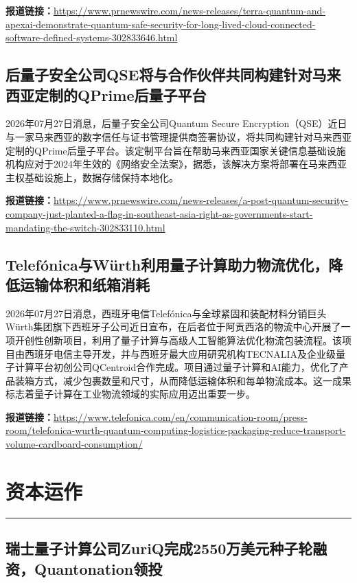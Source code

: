 \documentclass[12pt,a4paper]{ctexart}
\begin{document}
\noindent\textbf{报道链接：}\url{https://www.prnewswire.com/news-releases/terra-quantum-and-apexai-demonstrate-quantum-safe-security-for-long-lived-cloud-connected-software-defined-systems-302833646.html}

\subsection{ 后量子安全公司QSE将与合作伙伴共同构建针对马来西亚定制的QPrime后量子平台 }

2026年07月27日消息，后量子安全公司Quantum Secure Encryption（QSE）近日与一家马来西亚的数字信任与证书管理提供商签署协议，将共同构建针对马来西亚定制的QPrime后量子平台。该定制平台旨在帮助马来西亚国家关键信息基础设施机构应对于2024年生效的《网络安全法案》，据悉，该解决方案将部署在马来西亚主权基础设施上，数据存储保持本地化。

\noindent\textbf{报道链接：}\url{https://www.prnewswire.com/news-releases/a-post-quantum-security-company-just-planted-a-flag-in-southeast-asia-right-as-governments-start-mandating-the-switch-302833110.html}

\subsection{ Telefónica与Würth利用量子计算助力物流优化，降低运输体积和纸箱消耗 }

2026年07月27日消息，西班牙电信Telefónica与全球紧固和装配材料分销巨头Würth集团旗下西班牙子公司近日宣布，在后者位于阿贡西洛的物流中心开展了一项开创性创新项目，利用了量子计算与高级人工智能算法优化物流包装流程。该项目由西班牙电信主导开发，并与西班牙最大应用研究机构TECNALIA及企业级量子计算平台初创公司QCentroid合作完成。项目通过量子计算和AI能力，优化了产品装箱方式，减少包裹数量和尺寸，从而降低运输体积和每单物流成本。这一成果标志着量子计算在工业物流领域的实际应用迈出重要一步。

\noindent\textbf{报道链接：}\url{https://www.telefonica.com/en/communication-room/press-room/telefonica-wurth-quantum-computing-logistics-packaging-reduce-transport-volume-cardboard-consumption/}


\newpage
\section{资本运作}
\vspace{-0.5em}
\noindent\rule{\linewidth}{1.5pt}

\subsection{ 瑞士量子计算公司ZuriQ完成2550万美元种子轮融资，Quantonation领投 }
\end{document}
